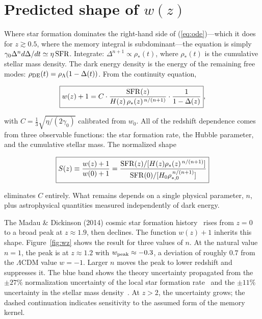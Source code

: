 \documentclass[12pt,a4paper]{article}
\begin{document}
\section*{Predicted shape of $w(z)$}

Where star formation dominates the right-hand side of (\ref{eq:ode})---which it does for $z\gtrsim0.5$, where the memory integral is subdominant---the equation is simply $\gamma_0\Delta^n d\Delta/dt\simeq\eta\,{\rm SFR}$. Integrate: $\Delta^{n+1}\propto\rho_*(t)$, where $\rho_*(t)$ is the cumulative stellar mass density. The dark energy density is the energy of the remaining free modes: $\rho_{\rm DE}(t)=\rho_\Lambda(1-\Delta(t))$. From the continuity equation,

\begin{equation}\label{eq:shape}
\boxed{w(z)+1 = C\cdot\frac{{\rm SFR}(z)}{H(z)\,\rho_*(z)^{\,n/(n+1)}}\cdot\frac{1}{1-\Delta(z)}},
\end{equation}

with $C=\frac{1}{3}\sqrt{\eta/(2\gamma_0)}$ calibrated from $w_0$. All of the redshift dependence comes from three observable functions: the star formation rate, the Hubble parameter, and the cumulative stellar mass. The normalized shape

\begin{equation}\label{eq:norm}
\boxed{S(z)\equiv\frac{w(z)+1}{w(0)+1} = \frac{{\rm SFR}(z)/[H(z)\rho_*(z)^{\,n/(n+1)}]}{{\rm SFR}(0)/[H_0\rho_{*,0}^{\,n/(n+1)}]}}
\end{equation}

eliminates $C$ entirely. What remains depends on a single physical parameter, $n$, plus astrophysical quantities measured independently of dark energy.

The Madau \& Dickinson (2014) cosmic star formation history~\cite{madau2014} rises from $z=0$ to a broad peak at $z\approx1.9$, then declines. The function $w(z)+1$ inherits this shape. Figure~\ref{fig:wz} shows the result for three values of $n$. At the natural value $n=1$, the peak is at $z\approx1.2$ with $w_{\rm peak}\approx-0.3$, a deviation of roughly $0.7$ from the $\Lambda$CDM value $w=-1$. Larger $n$ moves the peak to lower redshift and suppresses it. The blue band shows the theory uncertainty propagated from the $\pm27\%$ normalization uncertainty of the local star formation rate~\cite{madau2014} and the $\pm11\%$ uncertainty in the stellar mass density~\cite{driver2018}. At $z>2$, the uncertainty grows; the dashed continuation indicates sensitivity to the assumed form of the memory kernel.
\end{document}
